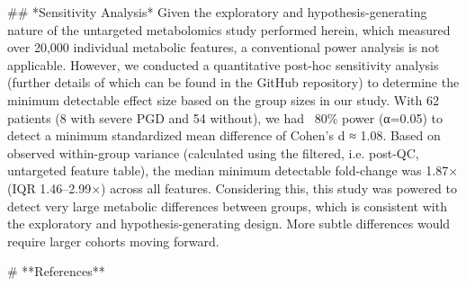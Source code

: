 ## *Sensitivity Analysis*
Given the exploratory and hypothesis-generating nature of the untargeted metabolomics study performed herein, which measured over 20,000 individual metabolic features, a conventional power analysis is not applicable. However, we conducted a quantitative post-hoc sensitivity analysis (further details of which can be found in the GitHub repository) to determine the minimum detectable effect size based on the group sizes in our study. With 62 patients (8 with severe PGD and 54 without), we had ~80\% power (α=0.05) to detect a minimum standardized mean difference of Cohen's d ≈ 1.08. Based on observed within-group variance (calculated using the filtered, i.e. post-QC, untargeted feature table), the median minimum detectable fold-change was 1.87× (IQR 1.46–2.99×) across all features. Considering this, this study was powered to detect very large metabolic differences between groups, which is consistent with the exploratory and hypothesis-generating design. More subtle differences would require larger cohorts moving forward.

\newpage
# **References**
